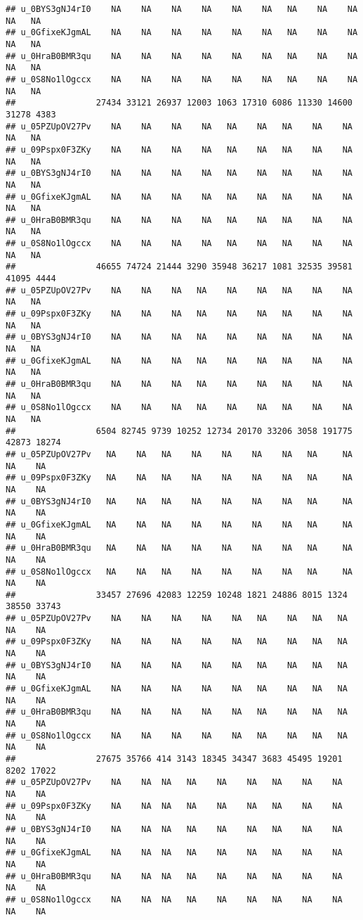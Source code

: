 \documentclass[
]{article}
\begin{document}
\begin{verbatim}
## u_0BYS3gNJ4rI0    NA    NA    NA    NA    NA    NA   NA    NA    NA    NA   NA
## u_0GfixeKJgmAL    NA    NA    NA    NA    NA    NA   NA    NA    NA    NA   NA
## u_0HraB0BMR3qu    NA    NA    NA    NA    NA    NA   NA    NA    NA    NA   NA
## u_0S8No1lOgccx    NA    NA    NA    NA    NA    NA   NA    NA    NA    NA   NA
##                27434 33121 26937 12003 1063 17310 6086 11330 14600 31278 4383
## u_05PZUpOV27Pv    NA    NA    NA    NA   NA    NA   NA    NA    NA    NA   NA
## u_09Pspx0F3ZKy    NA    NA    NA    NA   NA    NA   NA    NA    NA    NA   NA
## u_0BYS3gNJ4rI0    NA    NA    NA    NA   NA    NA   NA    NA    NA    NA   NA
## u_0GfixeKJgmAL    NA    NA    NA    NA   NA    NA   NA    NA    NA    NA   NA
## u_0HraB0BMR3qu    NA    NA    NA    NA   NA    NA   NA    NA    NA    NA   NA
## u_0S8No1lOgccx    NA    NA    NA    NA   NA    NA   NA    NA    NA    NA   NA
##                46655 74724 21444 3290 35948 36217 1081 32535 39581 41095 4444
## u_05PZUpOV27Pv    NA    NA    NA   NA    NA    NA   NA    NA    NA    NA   NA
## u_09Pspx0F3ZKy    NA    NA    NA   NA    NA    NA   NA    NA    NA    NA   NA
## u_0BYS3gNJ4rI0    NA    NA    NA   NA    NA    NA   NA    NA    NA    NA   NA
## u_0GfixeKJgmAL    NA    NA    NA   NA    NA    NA   NA    NA    NA    NA   NA
## u_0HraB0BMR3qu    NA    NA    NA   NA    NA    NA   NA    NA    NA    NA   NA
## u_0S8No1lOgccx    NA    NA    NA   NA    NA    NA   NA    NA    NA    NA   NA
##                6504 82745 9739 10252 12734 20170 33206 3058 191775 42873 18274
## u_05PZUpOV27Pv   NA    NA   NA    NA    NA    NA    NA   NA     NA    NA    NA
## u_09Pspx0F3ZKy   NA    NA   NA    NA    NA    NA    NA   NA     NA    NA    NA
## u_0BYS3gNJ4rI0   NA    NA   NA    NA    NA    NA    NA   NA     NA    NA    NA
## u_0GfixeKJgmAL   NA    NA   NA    NA    NA    NA    NA   NA     NA    NA    NA
## u_0HraB0BMR3qu   NA    NA   NA    NA    NA    NA    NA   NA     NA    NA    NA
## u_0S8No1lOgccx   NA    NA   NA    NA    NA    NA    NA   NA     NA    NA    NA
##                33457 27696 42083 12259 10248 1821 24886 8015 1324 38550 33743
## u_05PZUpOV27Pv    NA    NA    NA    NA    NA   NA    NA   NA   NA    NA    NA
## u_09Pspx0F3ZKy    NA    NA    NA    NA    NA   NA    NA   NA   NA    NA    NA
## u_0BYS3gNJ4rI0    NA    NA    NA    NA    NA   NA    NA   NA   NA    NA    NA
## u_0GfixeKJgmAL    NA    NA    NA    NA    NA   NA    NA   NA   NA    NA    NA
## u_0HraB0BMR3qu    NA    NA    NA    NA    NA   NA    NA   NA   NA    NA    NA
## u_0S8No1lOgccx    NA    NA    NA    NA    NA   NA    NA   NA   NA    NA    NA
##                27675 35766 414 3143 18345 34347 3683 45495 19201 8202 17022
## u_05PZUpOV27Pv    NA    NA  NA   NA    NA    NA   NA    NA    NA   NA    NA
## u_09Pspx0F3ZKy    NA    NA  NA   NA    NA    NA   NA    NA    NA   NA    NA
## u_0BYS3gNJ4rI0    NA    NA  NA   NA    NA    NA   NA    NA    NA   NA    NA
## u_0GfixeKJgmAL    NA    NA  NA   NA    NA    NA   NA    NA    NA   NA    NA
## u_0HraB0BMR3qu    NA    NA  NA   NA    NA    NA   NA    NA    NA   NA    NA
## u_0S8No1lOgccx    NA    NA  NA   NA    NA    NA   NA    NA    NA   NA    NA
\end{verbatim}
\end{document}
